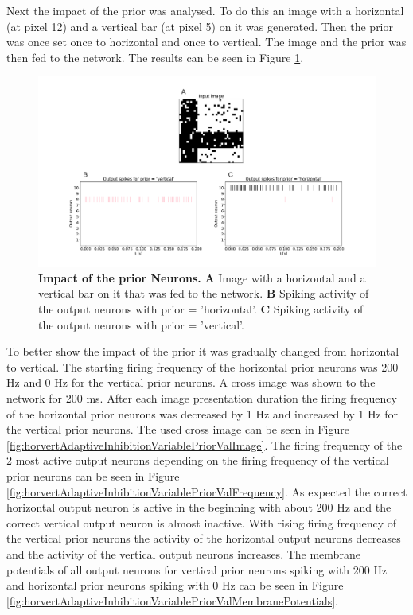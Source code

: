 Next the impact of the prior was analysed. To do this an image with a horizontal (at pixel 12) and a vertical bar (at pixel 5) on it was generated. Then the prior was once set once to horizontal and once to vertical. The image and the prior was then fed to the network. The results can be seen in Figure \ref{fig:horvertAdaptiveInhibitionPriorValResults}.

\begin{figure}
  \includegraphics[width=\linewidth]{figures/horvertAdaptiveInh/20priors_pos5and12/crossValidation.png}
  \caption{\textbf{Impact of the prior Neurons.} \textbf{A} Image with a horizontal and a vertical bar on it that was fed to the network. \textbf{B} Spiking activity of the output neurons with prior = 'horizontal'. \textbf{C} Spiking activity of the output neurons with prior = 'vertical'. }
  \label{fig:horvertAdaptiveInhibitionPriorValResults}
\end{figure}

To better show the impact of the prior it was gradually changed from horizontal to vertical. The starting firing frequency of the horizontal prior neurons was 200 Hz and 0 Hz for the vertical prior neurons. A cross image was shown to the network for 200 ms. After each image presentation duration the firing frequency of the horizontal prior neurons was decreased by 1 Hz and increased by 1 Hz for the vertical prior neurons. The used cross image can be seen in Figure \ref{fig:horvertAdaptiveInhibitionVariablePriorValImage}. The firing frequency of the 2 most active output neurons depending on the firing frequency of the vertical prior neurons can be seen in Figure \ref{fig:horvertAdaptiveInhibitionVariablePriorValFrequency}. As expected the correct horizontal output neuron is active in the beginning with about 200 Hz and the correct vertical output neuron is almost inactive. With rising firing frequency of the vertical prior neurons the activity of the horizontal output neurons decreases and the activity of the vertical output neurons increases. The membrane potentials of all output neurons for vertical prior neurons spiking with 200 Hz and horizontal prior neurons spiking with 0 Hz can be seen in Figure \ref{fig:horvertAdaptiveInhibitionVariablePriorValMembranePotentials}.

